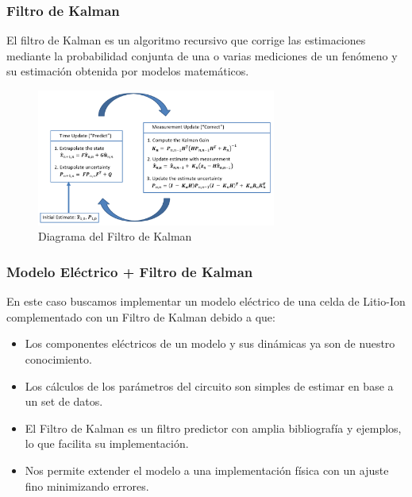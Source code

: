 \documentclass[10pt]{beamer}
\theoremstyle{remark}
\theoremstyle{definition}
\begin{document}
\begin{frame}[allowframebreaks]
  	\frametitle{Filtro de Kalman}
  	El filtro de Kalman es un algoritmo recursivo que corrige las estimaciones
  	mediante la probabilidad conjunta de una o varias mediciones de un fenómeno y
  	su estimación obtenida por modelos matemáticos.
  	\begin{figure}[h!]
		\centering
		\includegraphics[width=0.7\textwidth]{images/KalmanFilterDiagram.png}
		\caption{Diagrama del Filtro de Kalman}
		\label{fig:kf_sch}
  	\end{figure}
\end{frame}

\begin{frame}[allowframebreaks]
	\frametitle{Modelo Eléctrico + Filtro de Kalman}
  	En este caso buscamos implementar un modelo eléctrico de una celda de
  	Litio-Ion complementado con un Filtro de Kalman debido a que:
  	\begin{itemize}
		\item	Los componentes eléctricos de un modelo y sus dinámicas ya son de
	  			nuestro conocimiento.
		\item 	Los cálculos de los parámetros del circuito son simples de estimar en
	  			base a un set de datos.
		\item 	El Filtro de Kalman es un filtro predictor con amplia bibliografía y
	  			ejemplos, lo que facilita su implementación.
		\item 	Nos permite extender el modelo a una implementación física con un
	  			ajuste fino minimizando errores.
  	\end{itemize}
\end{frame}
\end{document}
